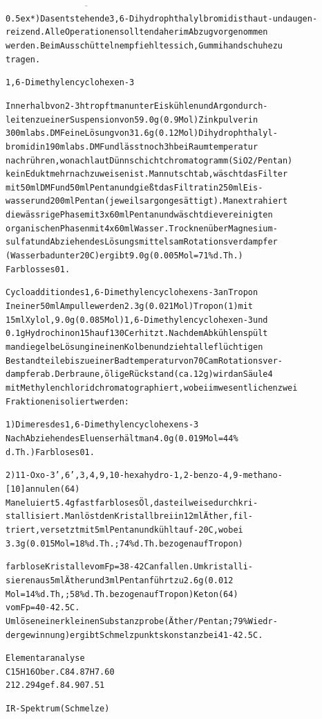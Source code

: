 \documentclass[a4paper,11pt]{article}
\begin{document}
\begin{alltt}
\(\overline{\hspace{7cm}}\)
\leavevmode\raise0.5ex\hbox{*}) Das entstehende 3,6-Dihydrophthalylbromid ist haut- und augen-
   reizend. Alle Operationen sollten daher im Abzug vorgenommen
   werden. Beim Ausschütteln empfiehlt es sich, Gummihandschuhe zu
   tragen.


\newpage
{}


1‚6-Dimethylencyclohexen-3

Innerhalb von 2 - 3 h tropft man unter Eiskühlen und Argondurch-
leiten zu einer Suspension von 59.0 g (0.9 Mol) Zinkpulver in
300 ml abs. DMF eine Lösung von 31.6 g (0.12 Mol) Dihydrophthalyl-
bromid in 190 ml abs. DMF und lässt noch 3 h bei Raumtemperatur
nachrühren, wonach laut Dünnschichtchromatogramm (SiO2/Pentan)
kein Edukt mehr nachzuweisen ist. Man nutscht ab, wäscht das Filter
mit 50 ml DMF und 50 ml Pentan und gießt das Filtrat in 250 ml Eis-
wasser und 200 ml Pentan (jeweils argongesättigt). Man extrahiert
die wässrige Phase mit 3 x 60 ml Pentan und wäscht die vereinigten
organischen Phasen mit 4 x 60 ml Wasser. Trocknen über Magnesium-
sulfat und Abziehen des Lösungsmittels am Rotationsverdampfer
(Wasserbad unter 20\degree{}C) ergibt 9.0 g (0.005 Mol = 71 \% d.Th.)
Farblosses 01.

Cycloaddition des 1,6-Dimethylencyclohexens-3 an Tropon
In einer 50 ml Ampulle werden 2.3 g (0.021 Mol) Tropon (1) mit
15 ml Xylol, 9.0 g (0.085 Mol) 1‚6-Dimethylencyclohexen-3 und
0.1 g Hydrochinon 15 h auf 130\degree{}C erhitzt. Nach dem Abkühlen spült
man die gelbe Lösung in einen Kolben und zieht alle flüchtigen
Bestandteile bis zu einer Badtemperatur von 70\degree{}C am Rotationsver-
dampfer ab. Der braune, ölige Rückstand (ca. 12 g) wird an Säule 4
mit Methylenchlorid chromatographiert, wobei im wesentlichen zwei
Fraktionen isoliert werden:

1) Dimeres des 1,6-Dimethylencyclohexens-3
   Nach Abziehen des Eluens erhält man 4.0 g (0.019 Mol = 44 \%
   d.Th.) Farbloses 01.

2) 11-Oxo-3'‚6'‚3,4‚9,10-hexahydro-1,2-benzo-4,9-methano-
   [10]annulen (64)
   Man eluiert 5.4 g fast farbloses Öl, das teilweise durchkri-
   stallisiert. Man löst den Kristallbrei in 12 ml Äther, fil-
   triert, versetzt mit 5 ml Pentan und kühlt auf -20\degree{}C, wobei
   3.3 g (0.015 Mol = 18 \% d.Th.; 74 \% d.Th. bezogen auf Tropon)


\newpage
{}


farblose Kristalle vom Fp = 38 - 42\degree{}C anfallen. Umkristalli-
sieren aus 5 ml Äther und 3 ml Pentan führt zu 2.6 g (0.012
Mol = 14 \% d.Th‚; 58 \% d.Th. bezogen auf Tropon) Keton (64)
vom Fp = 40 - 42.5\degree{}C.
Umlösen einer kleinen Substanzprobe (Äther/Pentan; 79 \% Wiedr-
dergewinnung) ergibt Schmelzpunktskonstanz bei 41 - 42.5\degree{}C.

Elementaranalyse
C15H16O ber. C 84.87 H 7.60
212.294 gef.   84.90   7.51

IR-Spektrum (Schmelze)
\end{alltt}
\end{document}
